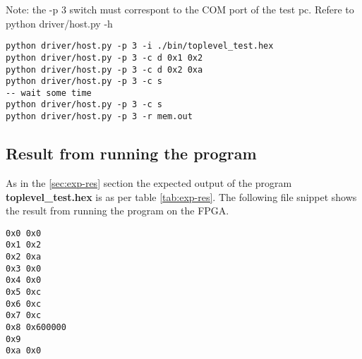 Note: the -p 3 switch must correspont to the COM port of the test pc. Refere to python driver/host.py -h

\begin{verbatim}
python driver/host.py -p 3 -i ./bin/toplevel_test.hex
python driver/host.py -p 3 -c d 0x1 0x2
python driver/host.py -p 3 -c d 0x2 0xa
python driver/host.py -p 3 -c s
-- wait some time
python driver/host.py -p 3 -c s
python driver/host.py -p 3 -r mem.out
\end{verbatim}

\subsection{Result from running the program}
As in the \ref{sec:exp-res} section the expected output of the program {\bf toplevel\_test.hex} is as per table \ref{tab:exp-res}.
The following file snippet shows the result from running the program on the FPGA.


\begin{verbatim}
0x0 0x0
0x1 0x2
0x2 0xa
0x3 0x0
0x4 0x0
0x5 0xc
0x6 0xc
0x7 0xc
0x8 0x600000
0x9
0xa	0x0
\end{verbatim}
